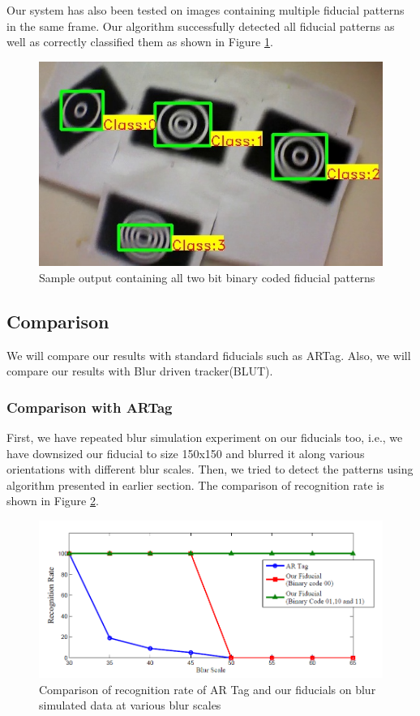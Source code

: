 \documentclass[runningheads]{llncs}
\begin{document}
Our system has also been tested on images containing multiple fiducial patterns
in the same frame. Our algorithm successfully detected all fiducial patterns as
well as correctly classified them as shown in Figure \ref{fig:output_all}.
\begin{figure}
\centering
  \includegraphics[width=.8\linewidth]{output_all_2.jpg}
  \caption{Sample output containing all two bit binary coded fiducial patterns}
  \label{fig:output_all}
\end{figure}

\subsection{Comparison}
We will compare our results with standard fiducials such as ARTag. Also, we will
compare our results with Blur driven tracker(BLUT)\cite{Wu:2011}.
\subsubsection{Comparison with ARTag}
First, we have repeated blur simulation experiment on our fiducials too, i.e.,
we have downsized our fiducial to size 150x150 and blurred it along various
orientations with different blur scales. Then, we tried to detect the patterns
using algorithm presented in earlier section. The comparison of recognition
rate is shown in Figure \ref{fig:recognition_rate}.

\begin{figure}
\centering
\includegraphics[width=\linewidth]{recognition_rate.png}
\caption{Comparison of recognition rate of AR Tag and our fiducials on
blur simulated data at various blur scales}
\label{fig:recognition_rate}
\end{figure}
\end{document}
